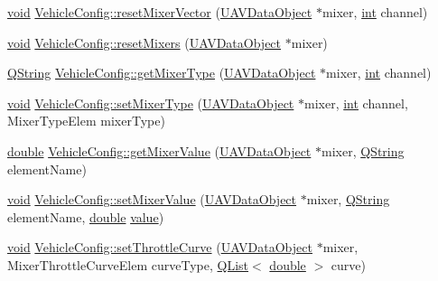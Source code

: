 \begin{DoxyCompactItemize}
\item 
\hyperlink{group___u_a_v_objects_plugin_ga444cf2ff3f0ecbe028adce838d373f5c}{void} \hyperlink{group___config_plugin_ga0e4c15b064550ea0899ed4e641ebb635}{Vehicle\-Config\-::reset\-Mixer\-Vector} (\hyperlink{class_u_a_v_data_object}{U\-A\-V\-Data\-Object} $\ast$mixer, \hyperlink{ioapi_8h_a787fa3cf048117ba7123753c1e74fcd6}{int} channel)
\item 
\hyperlink{group___u_a_v_objects_plugin_ga444cf2ff3f0ecbe028adce838d373f5c}{void} \hyperlink{group___config_plugin_ga2d8c952fda6b946cc3e0d184830c16f4}{Vehicle\-Config\-::reset\-Mixers} (\hyperlink{class_u_a_v_data_object}{U\-A\-V\-Data\-Object} $\ast$mixer)
\item 
\hyperlink{group___u_a_v_objects_plugin_gab9d252f49c333c94a72f97ce3105a32d}{Q\-String} \hyperlink{group___config_plugin_ga701b45580113989b2875514df233a598}{Vehicle\-Config\-::get\-Mixer\-Type} (\hyperlink{class_u_a_v_data_object}{U\-A\-V\-Data\-Object} $\ast$mixer, \hyperlink{ioapi_8h_a787fa3cf048117ba7123753c1e74fcd6}{int} channel)
\item 
\hyperlink{group___u_a_v_objects_plugin_ga444cf2ff3f0ecbe028adce838d373f5c}{void} \hyperlink{group___config_plugin_ga060909ce68f927e2b3f6d7b14d36a3b8}{Vehicle\-Config\-::set\-Mixer\-Type} (\hyperlink{class_u_a_v_data_object}{U\-A\-V\-Data\-Object} $\ast$mixer, \hyperlink{ioapi_8h_a787fa3cf048117ba7123753c1e74fcd6}{int} channel, Mixer\-Type\-Elem mixer\-Type)
\item 
\hyperlink{_super_l_u_support_8h_a8956b2b9f49bf918deed98379d159ca7}{double} \hyperlink{group___config_plugin_ga4043ba19db9003bbebdc196ccc54bc72}{Vehicle\-Config\-::get\-Mixer\-Value} (\hyperlink{class_u_a_v_data_object}{U\-A\-V\-Data\-Object} $\ast$mixer, \hyperlink{group___u_a_v_objects_plugin_gab9d252f49c333c94a72f97ce3105a32d}{Q\-String} element\-Name)
\item 
\hyperlink{group___u_a_v_objects_plugin_ga444cf2ff3f0ecbe028adce838d373f5c}{void} \hyperlink{group___config_plugin_ga7f2b470b423569fa6b07c81e21288e28}{Vehicle\-Config\-::set\-Mixer\-Value} (\hyperlink{class_u_a_v_data_object}{U\-A\-V\-Data\-Object} $\ast$mixer, \hyperlink{group___u_a_v_objects_plugin_gab9d252f49c333c94a72f97ce3105a32d}{Q\-String} element\-Name, \hyperlink{_super_l_u_support_8h_a8956b2b9f49bf918deed98379d159ca7}{double} \hyperlink{glext_8h_aa0e2e9cea7f208d28acda0480144beb0}{value})
\item 
\hyperlink{group___u_a_v_objects_plugin_ga444cf2ff3f0ecbe028adce838d373f5c}{void} \hyperlink{group___config_plugin_gaa0e88bc5f48d30ef5c1ef359ab2803ee}{Vehicle\-Config\-::set\-Throttle\-Curve} (\hyperlink{class_u_a_v_data_object}{U\-A\-V\-Data\-Object} $\ast$mixer, Mixer\-Throttle\-Curve\-Elem curve\-Type, \hyperlink{class_q_list}{Q\-List}$<$ \hyperlink{_super_l_u_support_8h_a8956b2b9f49bf918deed98379d159ca7}{double} $>$ curve)

\end{DoxyCompactItemize}
